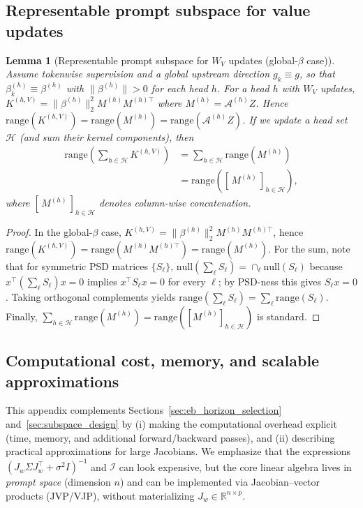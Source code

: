 \documentclass{article}
\theoremstyle{plain}
\newtheorem{lemma}[theorem]{Lemma}
\theoremstyle{definition}
\theoremstyle{remark}
\begin{document}
\subsection{Representable prompt subspace for value updates}
\label{app:representable_subspace}

\begin{lemma}[Representable prompt subspace for $W_V$ updates (global-$\beta$ case)]
\label{lem:representable_subspace_WV}
Assume tokenwise supervision and a global upstream direction $g_k\equiv g$, so that
$\beta_k^{(h)}\equiv\beta^{(h)}$ with $\|\beta^{(h)}\|>0$ for each head $h$.
For a head $h$ with $W_V$ updates, $K^{(h,V)}=\|\beta^{(h)}\|_2^2 M^{(h)}M^{(h)\top}$ where $M^{(h)}=\mathcal{A}^{(h)}Z$.
Hence $\mathrm{range}(K^{(h,V)})=\mathrm{range}(M^{(h)})=\mathrm{range}(\mathcal{A}^{(h)}Z)$.
If we update a head set $\mathcal{H}$ (and sum their kernel components), then
\begin{align}
    \mathrm{range}\!\left(\sum_{h\in\mathcal{H}} K^{(h,V)}\right) 
    &= \sum_{h\in\mathcal{H}} \mathrm{range}(M^{(h)}) \\
    &= \mathrm{range}\!\left([\,M^{(h)}\,]_{h\in\mathcal{H}}\right),
\end{align}
where $[\,M^{(h)}\,]_{h\in\mathcal{H}}$ denotes column-wise concatenation.
\end{lemma}

\begin{proof}
In the global-$\beta$ case, $K^{(h,V)}=\|\beta^{(h)}\|_2^2 M^{(h)}M^{(h)\top}$, hence
$\mathrm{range}(K^{(h,V)})=\mathrm{range}(M^{(h)}M^{(h)\top})=\mathrm{range}(M^{(h)})$.
For the sum, note that for symmetric PSD matrices $\{S_\ell\}$,
$\mathrm{null}(\sum_\ell S_\ell)=\cap_\ell \mathrm{null}(S_\ell)$ because
$x^\top(\sum_\ell S_\ell)x=0$ implies $x^\top S_\ell x=0$ for every $\ell$; by PSD-ness this gives $S_\ell x=0$.
Taking orthogonal complements yields
$\mathrm{range}(\sum_\ell S_\ell)=\sum_\ell \mathrm{range}(S_\ell)$.
Finally, $\sum_{h\in\mathcal{H}}\mathrm{range}(M^{(h)})=\mathrm{range}([M^{(h)}]_{h\in\mathcal{H}})$ is standard.
\end{proof}



\subsection{Computational cost, memory, and scalable approximations}
\label{app:computational}

This appendix complements Sections~\ref{sec:eb_horizon_selection} and~\ref{sec:subspace_design} by (i) making
the computational overhead explicit (time, memory, and additional forward/backward passes), and (ii) describing
practical approximations for large Jacobians. We emphasize that the expressions
$(J_w\Sigma J_w^\top+\sigma^2 I)^{-1}$ and $\mathcal I$ can look expensive, but the core linear algebra lives in
\emph{prompt space} (dimension $n$) and can be implemented via Jacobian--vector products (JVP/VJP), without
materializing $J_w\in\mathbb{R}^{n\times p}$.
\end{document}
